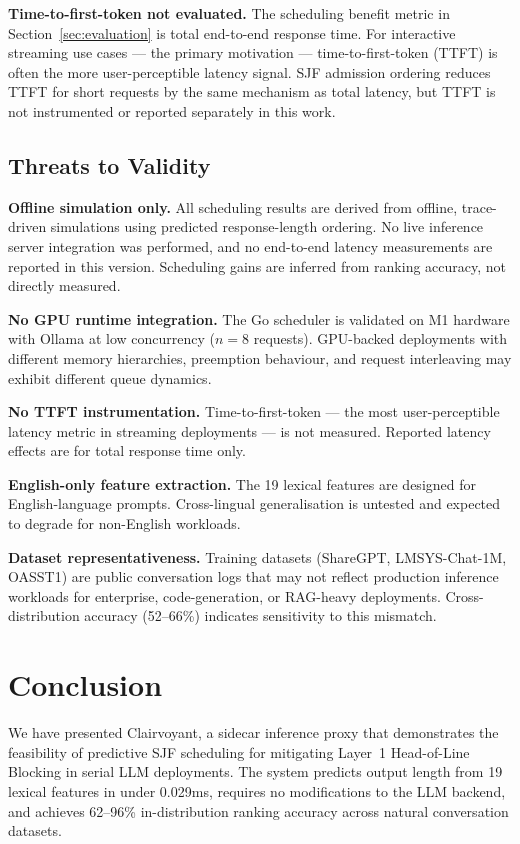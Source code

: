 \documentclass[10pt,letterpaper]{article}
\begin{document}
\textbf{Time-to-first-token not evaluated.} The scheduling benefit metric in Section~\ref{sec:evaluation} is total end-to-end response time. For interactive streaming use cases --- the primary motivation --- time-to-first-token (TTFT) is often the more user-perceptible latency signal. SJF admission ordering reduces TTFT for short requests by the same mechanism as total latency, but TTFT is not instrumented or reported separately in this work.

\subsection*{Threats to Validity}

\textbf{Offline simulation only.} All scheduling results are derived from offline, trace-driven simulations using predicted response-length ordering. No live inference server integration was performed, and no end-to-end latency measurements are reported in this version. Scheduling gains are inferred from ranking accuracy, not directly measured.

\textbf{No GPU runtime integration.} The Go scheduler is validated on M1 hardware with Ollama at low concurrency ($n=8$ requests). GPU-backed deployments with different memory hierarchies, preemption behaviour, and request interleaving may exhibit different queue dynamics.

\textbf{No TTFT instrumentation.} Time-to-first-token --- the most user-perceptible latency metric in streaming deployments --- is not measured. Reported latency effects are for total response time only.

\textbf{English-only feature extraction.} The 19 lexical features are designed for English-language prompts. Cross-lingual generalisation is untested and expected to degrade for non-English workloads.

\textbf{Dataset representativeness.} Training datasets (ShareGPT, LMSYS-Chat-1M, OASST1) are public conversation logs that may not reflect production inference workloads for enterprise, code-generation, or RAG-heavy deployments. Cross-distribution accuracy (52--66\%) indicates sensitivity to this mismatch.

\section{Conclusion}
\label{sec:conclusion}

We have presented Clairvoyant, a sidecar inference proxy that demonstrates the feasibility of predictive SJF scheduling for mitigating Layer~1 Head-of-Line Blocking in serial LLM deployments. The system predicts output length from 19 lexical features in under 0.029ms, requires no modifications to the LLM backend, and achieves 62--96\% in-distribution ranking accuracy across natural conversation datasets.
\end{document}
